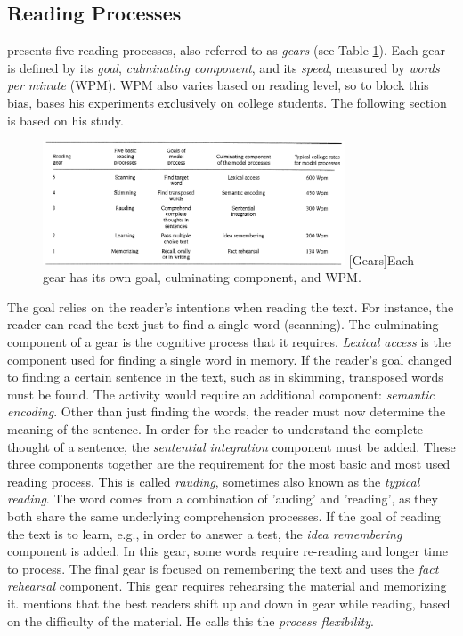 \subsection{Reading Processes}
 presents five reading processes, also referred to as \textit{gears} (see Table \ref{fig:gears_list}). Each gear is defined by its \textit{goal}, \textit{culminating component}, and its \textit{speed}, measured by \textit{words per minute} (WPM). WPM also varies based on reading level, so to block this bias, \citeauthor{carver_reading_1992} bases his experiments exclusively on college students. The following section is based on his study.

\begin{figure}[htbp]
\centering
\captionsetup{justification=centering}
\includegraphics[width=0.8\textwidth]{Pics/gears_list}
[Gears]{Each gear has its own goal, culminating component, and WPM. \protect\cite{carver_reading_1992}}
\label{fig:gears_list}
\end{figure}

The goal relies on the reader's intentions when reading the text. For instance, the reader can read the text just to find a single word (scanning). The culminating component of a gear is the cognitive process that it requires. \textit{Lexical access} is the component used for finding a single word in memory. If the reader's goal changed to finding a certain sentence in the text, such as in skimming, transposed words must be found. The activity would require an additional component: \textit{semantic encoding}. Other than just finding the words, the reader must now determine the meaning of the sentence. In order for the reader to understand the complete thought of a sentence, the \textit{sentential integration} component must be added. These three components together are the requirement for the most basic and most used reading process. This is called \textit{rauding}, sometimes also known as the \textit{typical reading}. The word comes from a combination of 'auding' and 'reading', as they both share the same underlying comprehension processes. If the goal of reading the text is to learn, e.g., in order to answer a test, the \textit{idea remembering} component is added. In this gear, some words require re-reading and longer time to process. The final gear is focused on remembering the text and uses the \textit{fact rehearsal} component. This gear requires rehearsing the material and memorizing it. 
 mentions that the best readers shift up and down in gear while reading, based on the difficulty of the material. He calls this the \textit{process flexibility}. 

